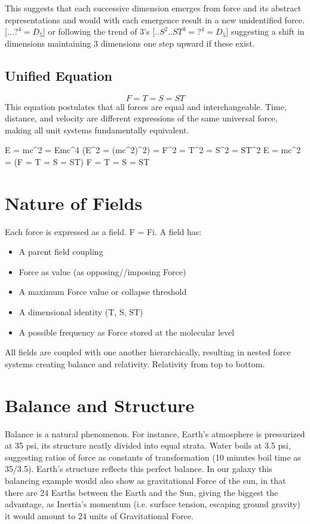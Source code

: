 \documentclass[12pt]{thesis}
\begin{document}
\noindent This suggests that each successive dimension emerges from force and its abstract representations and would with each emergence result in a new unidentified force. [$...?^4 = D_5$] or following the trend of 3's [$..S^2..ST^3 = ?^4 = D_5$] suggesting a shift in dimensions maintaining 3 dimensions one step upward if these exist.

\subsection{Unified Equation}
\[
F = T = S = ST
\]
This equation postulates that all forces are equal and interchangeable. Time, distance, and velocity are different expressions of the same universal force, making all unit systems fundamentally equivalent.

E = mc^2 = Emc^4
(E^2 = (mc^2)^2) = F^2 = T^2 = S^2 = ST^2
E = mc^2 = (F = T = S = ST)
F = T = S = ST

\section{Nature of Fields}
Each force is expressed as a field. F = Fi. A field has:
\begin{itemize}
    \item A parent field coupling
    \item Force as value (as opposing//imposing Force)
    \item A maximum Force value or collapse threshold
    \item A dimensional identity (T, S, ST)
    \item A possible frequency as Force stored at the molecular level
\end{itemize}

All fields are coupled with one another hierarchically, resulting in nested force systems creating balance and relativity. Relativity from top to bottom.

\section{Balance and Structure}
Balance is a natural phenomenon. For instance, Earth’s atmosphere is pressurized at 35 psi, its structure neatly divided into equal strata. Water boils at 3.5 psi, suggesting ratios of force as constants of transformation (10 minutes boil time as 35/3.5). Earth’s structure reflects this perfect balance. In our galaxy this balancing example would also show as gravitational Force of the sun, in that there are 24 Earths between the Earth and the Sun, giving the biggest the advantage, as Inertia's momentum (i.e. surface tension, escaping ground gravity) it would amount to 24 units of Gravitational Force. 
\end{document}
